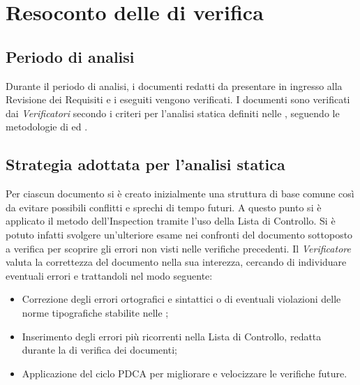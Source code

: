 \section{Resoconto delle  di verifica}
\label{resoconto}
\subsection{Periodo di analisi}
Durante il periodo di analisi, i documenti redatti da presentare in ingresso alla Revisione dei Requisiti e i  eseguiti vengono verificati. I documenti sono verificati dai \textit{Verificatori} secondo i criteri per l'analisi statica definiti nelle , seguendo le metodologie di  ed .
\subsection{Strategia adottata per l'analisi statica}
Per ciascun documento si è creato inizialmente una struttura di base comune così da evitare possibili conflitti e sprechi di tempo futuri. A questo punto si è applicato il metodo dell'Inspection tramite l'uso della Lista di Controllo. Si è potuto infatti svolgere un’ulteriore esame nei confronti del documento sottoposto a verifica per scoprire gli errori non visti nelle verifiche precedenti. Il \textit{Verificatore} valuta la correttezza del documento nella sua interezza, cercando di individuare eventuali errori e trattandoli nel modo seguente:
	\begin{itemize}
		\item Correzione degli errori ortografici e sintattici o di eventuali violazioni delle norme tipografiche stabilite nelle ;
		\item Inserimento degli errori più ricorrenti nella Lista di Controllo, redatta durante la  di verifica dei documenti;
		\item Applicazione del ciclo PDCA per migliorare e velocizzare le verifiche future.
	\end{itemize}
